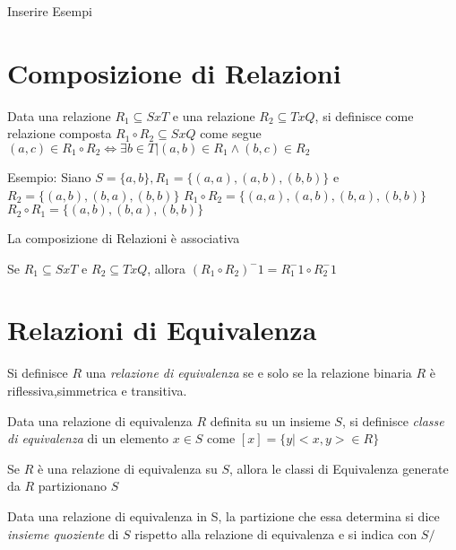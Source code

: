 Inserire Esempi

\section{Composizione di Relazioni}
Data una relazione $R_1 \subseteq S x T$ e una relazione $R_2 \subseteq T x Q$,
si definisce come relazione composta $R_1 \circ R_2 \subseteq S x Q$ come segue
$(a,c) \in R_1 \circ R_2 \iff \exists b \in T | (a,b) \in R_1 \land (b,c) \in R_2$

Esempio:
Siano $S = \{ a,b \}, R_1 = \{ (a,a),(a,b),(b,b) \}$ e $R_2 = \{ (a,b),(b,a),(b,b) \}$
$R_1 \circ R_2 = \{ (a,a),(a,b),(b,a),(b,b) \}$ \newline
$R_2 \circ R_1 = \{ (a,b),(b,a),(b,b) \}$

\begin{prop}
La composizione di Relazioni è associativa
\end{prop}

\begin{thm}
Se $R_1 \subseteq S x T$ e $R_2 \subseteq T x Q$, allora $(R_1 \circ R_2)^-1 = R_1^-1 \circ R_2^-1$
\end{thm}




\section{Relazioni di Equivalenza}
Si definisce $R$ una \emph{relazione di equivalenza} se e solo se la relazione binaria
$R$ è riflessiva,simmetrica e transitiva.


Data una relazione di equivalenza $R$ definita su un insieme $S$, si definisce
\emph{classe di equivalenza} di un elemento $x \in S$ come $[x] = \{y | <x,y> \in R \}$

\begin{thm}
Se $R$ è una relazione di equivalenza su $S$, allora le classi di Equivalenza
generate da $R$ partizionano $S$
\end{thm}

Data una relazione di equivalenza in S, la partizione che essa determina si dice
\emph{insieme quoziente} di $S$ rispetto alla relazione di equivalenza e si indica con $S/$


